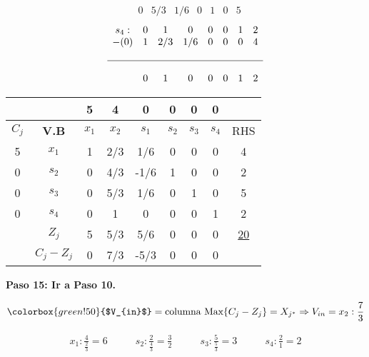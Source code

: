 \documentclass{templateNote}
\begin{document}
\begin{itemize}
\begin{equation*}
\begin{array}{cccccccc}
            & 0 & 5/3 & 1/6 & 0 & 1 & 0 & 5
        \end{array}
    \end{equation*}
    \vspace{0.5cm}
    \begin{equation*}
        \begin{array}{cccccccc}
            s_4: & 0 & 1 & 0 & 0 & 0 & 1 & 2 \\
            -(0) & 1 & 2/3 & 1/6 & 0 & 0 & 0 & 4 \\
            \\ \hline \\
            & 0 & 1 & 0 & 0 & 0 & 1 & 2
        \end{array}
    \end{equation*}
\end{itemize}
\begin{center}
    \begin{tabular}{|c|c|c|c|c|c|c|c|c|}
        \hline
        & & 5 & 4 & 0 & 0 & 0 & 0 & \\ \hline
        $C_j$ & \textbf{V.B} & $x_1$ & $x_2$ & $s_1$ & $s_2$ & $s_3$ & $s_4$ & RHS \\ \hline
        5 & $x_1$ & 1 & 2/3 & 1/6 & 0 & 0 & 0 & 4 \\ \hline
        0 & $s_2$ & 0 & 4/3 & -1/6 & 1 & 0 & 0 & 2 \\ \hline
        0 & $s_3$ & 0 & 5/3 & 1/6 & 0 & 1 & 0 & 5 \\ \hline
        0 & $s_4$ & 0 & 1 & 0 & 0 & 0 & 1 & 2 \\ \hline
        & $Z_j$ & 5 & 5/3 & 5/6 & 0 & 0 & 0 & \underline{20} \\ \hline
        & $C_j - Z_j$ & 0 & 7/3 & -5/3 & 0 & 0 & 0 & \\ \hline
    \end{tabular}
\end{center}
\newpage
\textbf{Paso 15: Ir a Paso 10.}
\begin{center}
    \begin{equation*}
        \colorbox{green!50}{$V_{in}$} = \text{columna Max} \{C_j-Z_j\} = X_{j^*} \Rightarrow V_{in} = x_2 : \frac{7}{3} 
    \end{equation*}
\end{center}
\begin{align*}
    x_1: \frac{4}{\frac{2}{3}} = 6 \qquad & s_2: \frac{2}{\frac{4}{3}} = \frac{3}{2} \qquad & s_3: \frac{5}{\frac{5}{3}} = 3 \qquad & s_4: \frac{2}{1} = 2
\end{align*}
\end{document}

